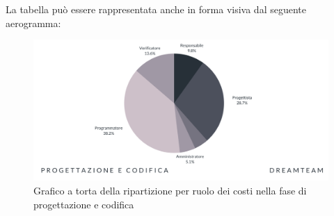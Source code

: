 La tabella può essere rappresentata anche in forma visiva dal seguente aerogramma:
\begin{figure}[!h]
\centering
\includegraphics[scale=0.65]{Sezioni/SezioniPreventivo/grafici/Progettazione_costi.png}
\caption{Grafico a torta della ripartizione per ruolo dei costi nella fase di progettazione e codifica}
\end{figure}



